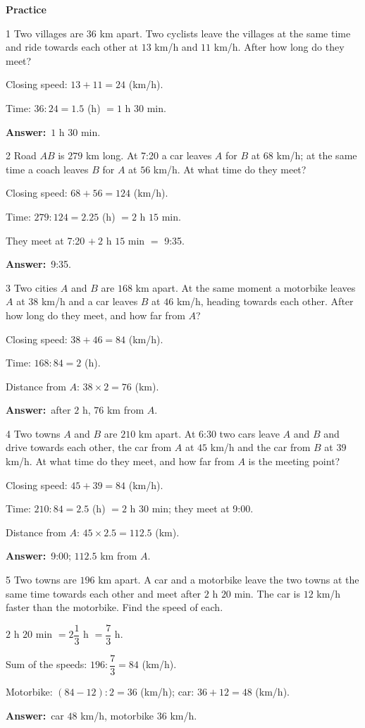 \documentclass[11pt]{article}
\newif\ifsol \solfalse
\providecommand{\AnsWord}{Đáp số}
\newcommand{\dapso}[1]{\par\textbf{\AnsWord:}\ #1}
\newcommand{\probsol}[1]{%
  \begin{lrbox}{\solmeasure}\begin{minipage}{\dimexpr\linewidth-24pt\relax}#1\end{minipage}\end{lrbox}%
  \ifsol
    \begin{solbox}#1\end{solbox}%
  \else
    \setlength{\solht}{\dimexpr\ht\solmeasure+\dp\solmeasure+0.85cm\relax}%
    \ifdim\solht<1.35cm\setlength{\solht}{1.35cm}\fi
    \begin{tcolorbox}[colback=white,colframe=Line,boxrule=0.8pt,arc=5pt,
      left=8pt,right=8pt,top=4pt,bottom=4pt,height=\solht]{\footnotesize\color{Slate}\itshape\WorkWord}\end{tcolorbox}%
  \fi}
\newcommand{\dividerbar}[1]{\par\vspace{0.6em}\noindent
  \begin{tcolorbox}[enhanced,frame hidden,interior hidden,borderline west={5pt}{0pt}{ProbBlue},
    colback=white,left=12pt,right=12pt,top=5pt,bottom=5pt,arc=4pt]
  {\large\bfseries\color{ProbBlue} #1}\end{tcolorbox}\vspace{0.4em}}
\newcommand{\gap}{\vspace{0.3cm}}
\def\WorkWord{Your work:}
\def\AnsWord{Answer}
\begin{document}
\dividerbar{Practice}
\begin{probbox}{1}{\relax}
Two villages are $36$ km apart. Two cyclists leave the villages at the same time and ride towards each other at $13$ km/h and $11$ km/h. After how long do they meet?
\end{probbox}
\probsol{
Closing speed: $13+11=24$ (km/h).\par Time: $36:24=1.5$ (h) $=1$ h $30$ min.
\dapso{$1$ h $30$ min.}}
\gap
\begin{probbox}{2}{\relax}
Road $AB$ is $279$ km long. At 7:20 a car leaves $A$ for $B$ at $68$ km/h; at the same time a coach leaves $B$ for $A$ at $56$ km/h. At what time do they meet?
\end{probbox}
\probsol{
Closing speed: $68+56=124$ (km/h).\par Time: $279:124=2.25$ (h) $=2$ h $15$ min.\par They meet at 7:20 $+\ 2$ h $15$ min $=$ 9:35.
\dapso{9:35.}}
\gap
\begin{probbox}{3}{\relax}
Two cities $A$ and $B$ are $168$ km apart. At the same moment a motorbike leaves $A$ at $38$ km/h and a car leaves $B$ at $46$ km/h, heading towards each other. After how long do they meet, and how far from $A$?
\end{probbox}
\probsol{
Closing speed: $38+46=84$ (km/h).\par Time: $168:84=2$ (h).\par Distance from $A$: $38\times2=76$ (km).
\dapso{after $2$ h, $76$ km from $A$.}}
\gap
\begin{probbox}{4}{\relax}
Two towns $A$ and $B$ are $210$ km apart. At 6:30 two cars leave $A$ and $B$ and drive towards each other, the car from $A$ at $45$ km/h and the car from $B$ at $39$ km/h. At what time do they meet, and how far from $A$ is the meeting point?
\end{probbox}
\probsol{
Closing speed: $45+39=84$ (km/h).\par Time: $210:84=2.5$ (h) $=2$ h $30$ min; they meet at 9:00.\par Distance from $A$: $45\times2.5=112.5$ (km).
\dapso{9:00; $112.5$ km from $A$.}}
\gap
\begin{probbox}{5}{\relax}
Two towns are $196$ km apart. A car and a motorbike leave the two towns at the same time towards each other and meet after $2$ h $20$ min. The car is $12$ km/h faster than the motorbike. Find the speed of each.
\end{probbox}
\probsol{
$2$ h $20$ min $=2\dfrac13$ h $=\dfrac73$ h.\par Sum of the speeds: $196:\dfrac73=84$ (km/h).\par
Motorbike: $(84-12):2=36$ (km/h); car: $36+12=48$ (km/h).
\dapso{car $48$ km/h, motorbike $36$ km/h.}}
\end{document}
